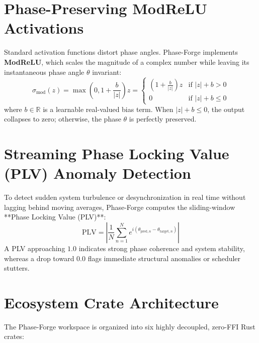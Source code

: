 \documentclass[11pt,a4paper]{article}
\begin{document}
\section{Phase-Preserving ModReLU Activations}
Standard activation functions distort phase angles. Phase-Forge implements \textbf{ModReLU}, which scales the magnitude of a complex number while leaving its instantaneous phase angle $\theta$ invariant:
\begin{equation}
\sigma_{\text{mod}}(z) = \max\left(0, 1 + \frac{b}{|z|}\right) z = \begin{cases} 
\left(1 + \frac{b}{|z|}\right) z & \text{if } |z| + b > 0 \\ 
0 & \text{if } |z| + b \le 0 
\end{cases}
\end{equation}
where $b \in \mathbb{R}$ is a learnable real-valued bias term. When $|z| + b \le 0$, the output collapses to zero; otherwise, the phase $\theta$ is perfectly preserved.

\section{Streaming Phase Locking Value (PLV) Anomaly Detection}
To detect sudden system turbulence or desynchronization in real time without lagging behind moving averages, Phase-Forge computes the sliding-window **Phase Locking Value (PLV)**:
\begin{equation}
\text{PLV} = \left| \frac{1}{N} \sum_{n=1}^{N} e^{i(\theta_{\text{pred}, n} - \theta_{\text{target}, n})} \right|
\end{equation}
A PLV approaching $1.0$ indicates strong phase coherence and system stability, whereas a drop toward $0.0$ flags immediate structural anomalies or scheduler stutters.

\section{Ecosystem Crate Architecture}
The Phase-Forge workspace is organized into six highly decoupled, zero-FFI Rust crates:
\end{document}
